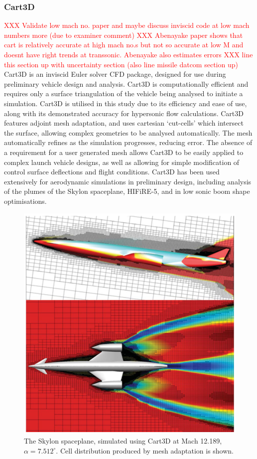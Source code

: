 \subsubsection{Cart3D}\label{sec:Cart3d}
\textcolor{red}{XXX Validate low mach no. paper and maybe discuss inviscid code at low mach numbers more (due to examiner comment)}
\textcolor{red}{XXX Abenayake paper shows that cart is relatively accurate at high mach no.s but not so accurate at low M and doesnt have right trends at transsonic. Abenayake also estimates errors}
\textcolor{red}{XXX line this section up with uncertainty section (also line missile datcom section up)}
Cart3D is an inviscid Euler solver CFD package, designed for use during preliminary vehicle design and analysis\cite{Almosnino2016}. Cart3D is computationally efficient and requires only a surface triangulation of the vehicle being analysed to initiate a simulation. Cart3D is utilised in this study due to its efficiency and ease of use, along with its demonstrated accuracy for hypersonic flow calculations\cite{Sagerman2017,Abeynayake,Aftosmis2011,Almosnino2016a}. Cart3D features adjoint mesh adaptation, and uses cartesian `cut-cells' which intersect the surface, allowing complex geometries to be analysed automatically. The mesh automatically refines as the simulation progresses, reducing error. The absence of a requirement for a user generated mesh allows Cart3D to be easily applied to complex launch vehicle designs, as well as allowing for simple modification of control surface deflections and flight conditions. 
Cart3D has been used extensively for aerodynamic simulations in preliminary design, including analysis of the plumes of the Skylon spaceplane\cite{Mehta2016}, HIFiRE-5\cite{Kimmel2010}, and in low sonic boom shape optimisations\cite{Aftosmis2011}. 
\begin{figure}[ht]
\centering
\includegraphics[width=0.6\linewidth]{figures/2_literature-review/Skylon-Cart3D}
\caption{The Skylon spaceplane, simulated using Cart3D at Mach 12.189, $\alpha=7.512^\circ$\cite{Mehta2016}. Cell distribution produced by mesh adaptation is shown.}
\label{fig:Skylon-Cart3D}
\end{figure}
